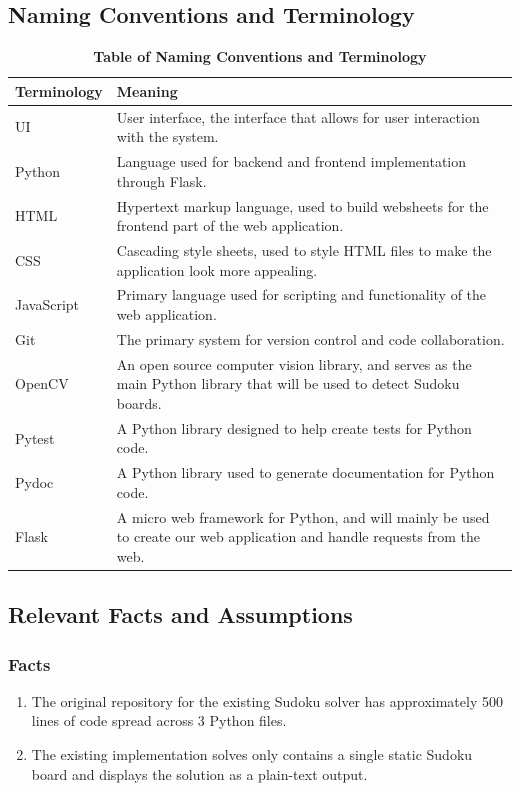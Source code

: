 \documentclass[11pt]{article}
\begin{document}
\subsection{Naming Conventions and Terminology}
\begin{table}[H]
\caption{\bf Table of Naming Conventions and Terminology}
\centering
\begin{tabularx}{\textwidth}{p{3cm}X}
\toprule
Terminology     & Meaning \\
\midrule
UI     & User interface, the interface that allows for user interaction with the system. \\
Python & Language used for backend and frontend implementation through Flask.\\
HTML & Hypertext markup language, used to build websheets for the frontend part of the web application.\\
CSS & Cascading style sheets, used to style HTML files to make the application look more appealing.\\
JavaScript & Primary language used for scripting and functionality of the web application. \\
Git & The primary system for version control and code collaboration.\\
OpenCV & An open source computer vision library, and serves as the main Python library that will be used to detect Sudoku boards. \\
Pytest & A Python library designed to help create tests for Python code. \\
Pydoc & A Python library used to generate documentation for Python code. \\
Flask & A micro web framework for Python, and will mainly be used to create our web application and handle requests from the web.\\
\bottomrule
\end{tabularx}
\end{table}
\subsection{Relevant Facts and Assumptions}

\subsubsection{Facts}

\begin{enumerate}
    \item The original repository for the existing Sudoku solver has approximately 500 lines of code spread across 3 Python files.
    \item The existing implementation solves only contains a single static Sudoku board and displays the solution as a plain-text output.
\end{enumerate}
\end{document}
